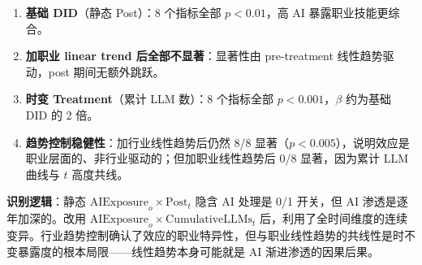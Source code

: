 \documentclass[12pt,a4paper]{article}
\begin{document}
\begin{exambox}
\begin{enumerate}
  \item \textbf{基础 DID}（静态 Post）：8 个指标全部 $p<0.01$，高 AI 暴露职业技能更综合。
  \item \textbf{加职业 linear trend 后全部不显著}：显著性由 pre-treatment 线性趋势驱动，post 期间无额外跳跃。
  \item \textbf{时变 Treatment}（累计 LLM 数）：8 个指标全部 $p<0.001$，$\beta$ 约为基础 DID 的 2 倍。
  \item \textbf{趋势控制稳健性}：加行业线性趋势后仍然 8/8 显著（$p<0.005$），说明效应是职业层面的、非行业驱动的；但加职业线性趋势后 0/8 显著，因为累计 LLM 曲线与 $t$ 高度共线。
\end{enumerate}

\medskip
\textbf{识别逻辑}：静态 $\text{AIExposure}_o \times \text{Post}_t$ 隐含 AI 处理是 0/1 开关，但 AI 渗透是逐年加深的。改用 $\text{AIExposure}_o \times \text{CumulativeLLMs}_t$ 后，利用了全时间维度的连续变异。行业趋势控制确认了效应的职业特异性，但与职业线性趋势的共线性是时不变暴露度的根本局限——线性趋势本身可能就是 AI 渐进渗透的因果后果。
\end{exambox}
\end{document}
